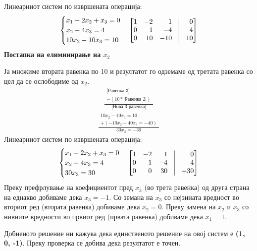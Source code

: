 \documentclass[12pt,a4paper]{article}
\begin{document}
	Линеарниот систем по извршената операција:
	\begin{align}
		\begin{cases}
			x_1 - 2x_2 + x_3 = 0 \\
			x_2 - 4x_3 = 4 \\
			10x_2 - 10x_3 = 10
		\end{cases}
		\begin{bmatrix*}[r]
			1 & -2 & 1 & \vline & 0 \\
			0 & 1 & -4 & \vline & 4 \\
			0 & 10 & -10 & \vline & 10
		\end{bmatrix*}
	\end{align}
	\textbf{Постапка на елиминирање на $x_2$}
	
	Ја множиме втората равенка по 10 и резултатот го одземаме од третата равенка со цел да се ослободиме од $x_2$.
		\begin{align}
		\frac{\begin{array}{c}
				\text{[Равенка 3]} \\
				-(10 * \text{[Равенка 2]})
		\end{array}}{
			\text{[Нова 3 равенка]}
		}
	\end{align}
	\begin{align}
		\frac{\begin{array}{c}
				10x_2 - 10x_3 = 10 \\
				+ (- 10x_2 + 40x_3 = -40)
		\end{array}}{
			30x_3 = -30
		}
	\end{align}
	Линеарниот систем по извршената операција:
	\begin{align}
		\begin{cases}
			x_1 - 2x_2 + x_3 = 0 \\
			x_2 - 4x_3 = 4 \\
			30x_3 = 30
		\end{cases}
		\begin{bmatrix*}[r]
			1 & -2 & 1 & \vline & 0 \\
			0 & 1 & -4 & \vline & 4 \\
			0 & 0 & 30 & \vline & -30
		\end{bmatrix*}
	\end{align}
	Преку префрлување на коефициентот пред $x_3$ (во трета равенка) од друга страна на еднакво добиваме дека $x_3 = -1$. Со земана на $x_3$ со нејзината вредност во вториот ред (втората равенка) добиваме дека $x_2 = 0$. Преку замена на $x_2$ и $x_3$ со нивните вредности во првиот ред (првата равенка) добиваме дека $x_1=1$.
	
	Добиеното решение ни кажува дека единственото решение на овој систем е \textbf{(1, 0, -1)}. Преку проверка се добива дека резултатот е точен.
\end{document}
